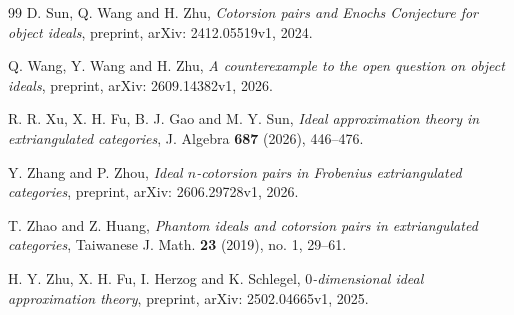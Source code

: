 \documentclass[11pt,a4paper,reqno]{amsart}
\theoremstyle{plain}
\theoremstyle{definition}
\theoremstyle{remark}
\begin{document}
\begin{thebibliography}{99}
D. Sun, Q. Wang and H. Zhu,
\emph{Cotorsion pairs and Enochs Conjecture for object ideals},
preprint, arXiv: 2412.05519v1, 2024.

Q. Wang, Y. Wang and H. Zhu,
\emph{A counterexample to the open question on object ideals},
preprint, arXiv: 2609.14382v1, 2026.

R. R. Xu, X. H. Fu, B. J. Gao and M. Y. Sun,
\emph{Ideal approximation theory in extriangulated categories},
J. Algebra \textbf{687} (2026), 446--476.

Y. Zhang and P. Zhou,
\emph{Ideal $n$-cotorsion pairs in Frobenius extriangulated categories},
preprint, arXiv: 2606.29728v1, 2026.

T. Zhao and Z. Huang,
\emph{Phantom ideals and cotorsion pairs in extriangulated categories},
Taiwanese J. Math. \textbf{23} (2019), no. 1, 29--61.

H. Y. Zhu, X. H. Fu, I. Herzog and K. Schlegel,
\emph{$0$-dimensional ideal approximation theory},
preprint, arXiv: 2502.04665v1, 2025.

\end{thebibliography}
\end{document}
